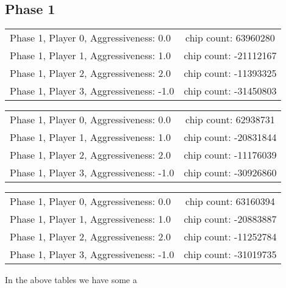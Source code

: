 \documentclass[titlepage, a4paper]{article}
\begin{document}
\subsection{Phase 1}\label{phase 1 results}
\begin{tabular}{| l | c |}
	\hline
	Phase 1, Player 0, Aggressiveness: 0.0 & chip count: 63960280\\
	Phase 1, Player 1, Aggressiveness: 1.0 & chip count: -21112167\\
	Phase 1, Player 2, Aggressiveness: 2.0 & chip count: -11393325\\
	Phase 1, Player 3, Aggressiveness: -1.0 & chip count: -31450803\\
	\hline
\end{tabular}

\begin{tabular}{| l | c |}
	\hline
	Phase 1, Player 0, Aggressiveness: 0.0 & chip count: 62938731\\
	Phase 1, Player 1, Aggressiveness: 1.0 & chip count: -20831844\\
	Phase 1, Player 2, Aggressiveness: 2.0 & chip count: -11176039\\
	Phase 1, Player 3, Aggressiveness: -1.0 & chip count: -30926860\\
	\hline
\end{tabular}

\begin{tabular}{| l | c |}
	\hline
	Phase 1, Player 0, Aggressiveness: 0.0 & chip count: 63160394\\
	Phase 1, Player 1, Aggressiveness: 1.0 & chip count: -20883887\\
	Phase 1, Player 2, Aggressiveness: 2.0 & chip count: -11252784\\
	Phase 1, Player 3, Aggressiveness: -1.0 & chip count: -31019735\\
	\hline
\end{tabular}

In the above tables we have some a
\end{document}
